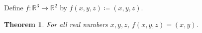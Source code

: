 \documentclass{article}
\newtheorem{theorem}{Theorem}
\begin{document}
Define $f:\mathbb{R}^3\to\mathbb{R}^2$ by $f(x,y,z)\coloneqq(x,y,z)$.
\begin{theorem}\label{thm:heldout}
For all real numbers $x,y,z$, $f(x,y,z)=(x,y)$.
\end{theorem}
\end{document}
